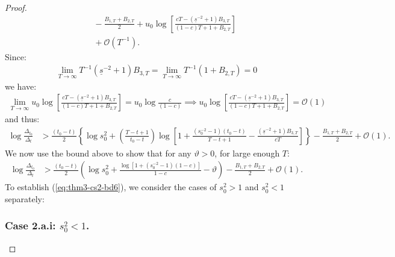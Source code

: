 \begin{proof}
\begin{align*}
    &\quad\: - \frac{B_{1,T} + B_{2,T}}{2} + u_0\log\left[\frac{cT - (\underline{s}^{-2} + 1) B_{3,T}}{(1-c)T + 1 + B_{2,T}}\right]  \\
    &\quad\: +  \mathcal{O}(T^{-1}). 
\end{align*}
Since:
\begin{align*}
    \lim_{T\to\infty} T^{-1} (\underline{s}^{-2} + 1) B_{3,T} = \lim_{T\to\infty} T^{-1} (1 + B_{2,T}) = 0
\end{align*}
we have: 
\begin{align*}
    \lim_{T \to \infty} u_0\log\left[\frac{cT - (\underline{s}^{-2} + 1) B_{3,T}}{(1-c)T + 1 + B_{2,T}}\right]  =  u_0\log \frac{c}{(1-c)} \implies u_0\log\left[\frac{cT - (\underline{s}^{-2} + 1) B_{3,T}}{(1-c)T + 1 + B_{2,T}}\right]  = \mathcal{O}(1)
\end{align*}
and thus:
\small
\begin{align}
    \log \frac{\Delta_{t_0}}{\Delta_t} &> \frac{(t_0-t)}{2}\left\{\log s_0^2 + \left(\frac{T - t +1}{t_0-t}\right)\log\left[1 + \frac{\left(s_0^{-2} -1\right)(t_0 - t)}{T - t + 1} - \frac{\left(\underline{s}^{-2} + 1\right) B_{3,T}}{cT} \right]\right\}  - \frac{B_{1,T} + B_{2,T}}{2}  +  \mathcal{O}(1). \label{eq:thm3-cs2-bd5}
\end{align}
\normalsize
We now use the bound above to show that for any $\vartheta > 0$, for large enough $T$:
\begin{align}
    \log \frac{\Delta_{t_0}}{\Delta_t} &> \frac{(t_0 - t)}{2} \left(\log s_0^2 + \frac{\log[1 + (s_0^{-2} -1)(1-c)]}{1-c} - \vartheta\right) - \frac{B_{1,T} + B_{2,T}}{2}  +  \mathcal{O}(1).  \label{eq:thm3-cs2-bd6} 
\end{align}
To establish (\ref{eq:thm3-cs2-bd6}), we consider the cases of $s_0^2 > 1$ and $s_0^2 < 1$ separately:

\subsubsection*{Case 2.a.i: $s_0^2 < 1$.}


\end{proof}
